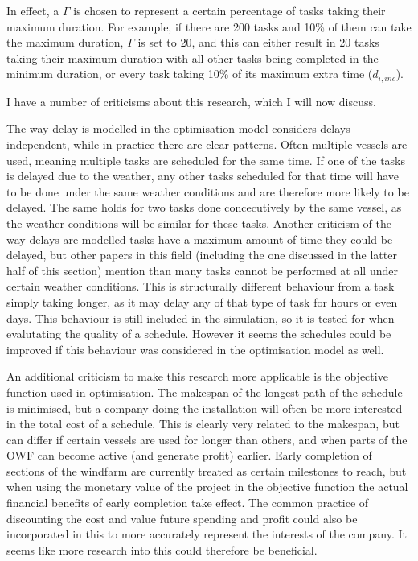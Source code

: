 \documentclass[a4paper,12pt]{article}
\begin{document}
In effect, a $\Gamma$ is chosen to represent a certain percentage of tasks taking their maximum duration. For example, if there are 200 tasks and 10\% of them can take the maximum duration, $\Gamma$ is set to 20, and this can either result in 20 tasks taking their maximum duration with all other tasks being completed in the minimum duration, or every task taking 10\% of its maximum extra time ($d_{i, inc}$). 

\bigskip

I have a number of criticisms about this research, which I will now discuss.

The way delay is modelled in the optimisation model considers delays independent, while in practice there are clear patterns. Often multiple vessels are used, meaning multiple tasks are scheduled for the same time. If one of the tasks is delayed due to the weather, any other tasks scheduled for that time will have to be done under the same weather conditions and are therefore more likely to be delayed. The same holds for two tasks done concecutively by the same vessel, as the weather conditions will be similar for these tasks. 
Another criticism of the way delays are modelled tasks have a maximum amount of time they could be delayed, but other papers in this field (including the one discussed in the latter half of this section) mention than many tasks cannot be performed at all under certain weather conditions. This is structurally different behaviour from a task simply taking longer, as it may delay any of that type of task for hours or even days. This behaviour is still included in the simulation, so it is tested for when evalutating the quality of a schedule. However it seems the schedules could be improved if this behaviour was considered in the optimisation model as well. 

An additional criticism to make this research more applicable is the objective function used in optimisation. The makespan of the longest path of the schedule is minimised, but a company doing the installation will often be more interested in the total cost of a schedule. This is clearly very related to the makespan, but can differ if certain vessels are used for longer than others, and when parts of the OWF can become active (and generate profit) earlier. Early completion of sections of the windfarm are currently treated as certain milestones to reach, but when using the monetary value of the project in the objective function the actual financial benefits of early completion take effect. The common practice of discounting the cost and value future spending and profit could also be incorporated in this to more accurately represent the interests of the company. It seems like more research into this could therefore be beneficial. 
\end{document}
